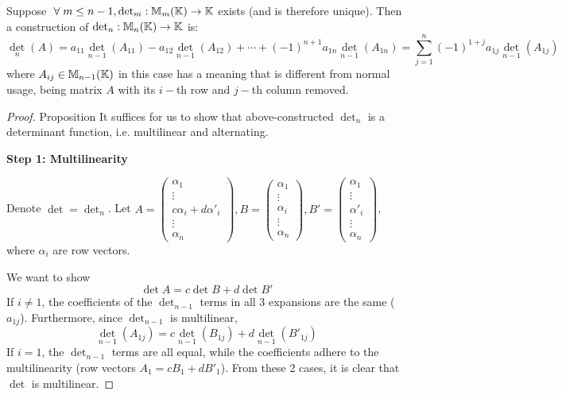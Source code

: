 \begin{proposition}
    Suppose \(\forall m \leq n-1, \det_m: \bbm_m (\bbk) \to \bbk\) exists (and is therefore unique). Then a construction of \(\det_n: \mathbb{M}_n(\mathbb{K}) \to \mathbb{K}\) is:
    \[
        \det_n (A) = a_{11}\det_{n-1}(A_{11}) - a_{12}\det_{n-1}(A_{12}) + \cdots + (-1)^{n+1}a_{1n}\det_{n-1}(A_{1n}) = \sum_{j=1}^{n}(-1)^{1+j}a_{1j}\det_{n-1}(A_{1j})
    \]
    where \(A_{ij} \in \mathbb{M}_{n-1}(\mathbb{K})\) in this case has a meaning that is different from normal usage, being matrix \(A\) with its \(i-\)th row and \(j-\)th column removed.
\end{proposition}

\begin{proof} {Proposition}
    It suffices for us to show that above-constructed \(\det_n\) is a determinant function, i.e. multilinear and alternating.

    \textbf{Step 1: Multilinearity}

    Denote \(\det = \det_n\).
    Let \(A = \begin{pmatrix}
        \alpha_1               \\
        \vdots                 \\
        c\alpha_i + d\alpha'_i \\
        \vdots                 \\
        \alpha_n
    \end{pmatrix}, B = \begin{pmatrix}
        \alpha_1 \\
        \vdots   \\
        \alpha_i \\
        \vdots   \\
        \alpha_n
    \end{pmatrix},B' = \begin{pmatrix}
        \alpha_1  \\
        \vdots    \\
        \alpha'_i \\
        \vdots    \\
        \alpha_n
    \end{pmatrix} \), where \(\alpha_i\) are row vectors.

    We want to show \[
        \det A = c \det B + d \det B'
    \]
    If \(i \neq 1\),  the coefficients of the \(\det_{n-1}\) terms in all 3 expansions are the same (\(a_{1j}\)). Furthermore, since \(\det_{n-1}\) is multilinear, \[
        \det_{n-1}(A_{1j}) = c\det_{n-1}(B_{1j}) + d\det_{n-1}(B'_{1j})
    \]
    If \(i=1\), the \(\det_{n-1}\) terms are all equal, while the coefficients adhere to the multilinearity (row vectors \(A_1 = c B_1 + d B'_1\)). From these 2 cases, it is clear that \(\det\) is multilinear.


\end{proof}
